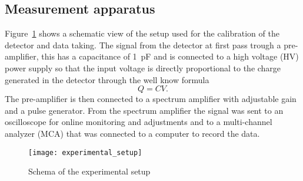 \subsection{Measurement apparatus}
\label{sec:meas-appar}
Figure~\ref{fig:exp_setup} shows a schematic view of the setup used for the
calibration of the detector and data taking. The signal from the detector at
first pass trough a pre-amplifier, this has a capacitance of 1~pF and is
connected to a high voltage (HV) power supply so that the input voltage is
directly proportional to the charge generated in the detector through the well
know formula\autocite{Knoll:RadMeasurement}
\begin{equation}
  \label{eq:capacitance}
  Q = CV.
\end{equation}
The pre-amplifier is then connected to a spectrum amplifier with adjustable gain
and a pulse generator. From the spectrum amplifier the signal was sent to an
oscilloscope for online monitoring and adjustments and to a multi-channel
analyzer (MCA) that was connected to a computer to record the data.
\begin{figure}[!h]
  \centering
  \texttt{[image: experimental\_setup]}
  \caption{Schema of the experimental setup}
  \label{fig:exp_setup}
\end{figure}
